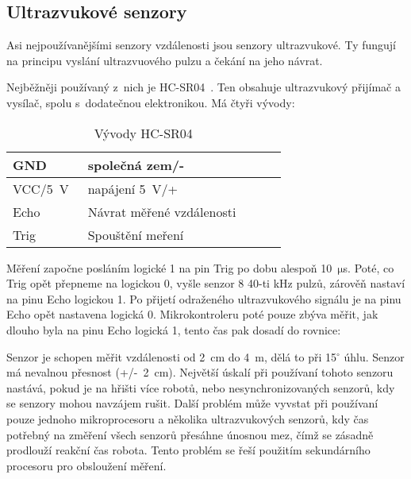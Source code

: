 \subsection{Ultrazvukové senzory}

Asi nejpoužívanějšími senzory vzdálenosti jsou senzory ultrazvukové.
Ty fungují na principu vyslání ultrazvuového pulzu a čekání na jeho návrat.

Nejběžněji používaný z~nich je HC-SR04~\cite{hc-sr04}. 
Ten obsahuje ultrazvukový přijímač a vysílač, spolu s~dodatečnou elektronikou.
Má čtyři vývody: 
\begin{table}[h]
	
	\centering
	\begin{tabular}{|l|l|l|l|l|} \hline
		GND & společná zem/-   \\ \hline
		VCC/5~V~& napájení 5~V/+  \\ \hline
		Echo & Návrat měřené vzdálenosti   \\ \hline
		Trig & Spouštění meření \\ \hline
    \end{tabular}
    \caption{Vývody HC-SR04}
\end{table}

Měření započne posláním logické 1 na pin Trig po dobu alespoň 10~$\mathrm{\mu}$s.
Poté, co Trig opět přepneme na logickou 0, vyšle senzor 8 40-ti kHz pulzů, zárověň nastaví na pinu Echo logickou 1.
Po přijetí odraženého ultrazvukového signálu je na pinu Echo opět nastavena logická 0.
Mikrokontroleru poté pouze zbýva měřit, jak dlouho byla na pinu Echo logická 1, tento čas pak dosadí do rovnice:
    
    
Senzor je schopen měřit vzdálenosti od 2~cm do 4~m, dělá to při 15$^{\circ}$ úhlu.
Senzor má nevalnou přesnost (+/-~2~cm).
Největší úskalí při používaní tohoto senzoru nastává, pokud je na hřišti více robotů, nebo nesynchronizovaných senzorů, kdy se senzory mohou navzájem rušit.
Další problém může vyvstat při používaní pouze jednoho mikroprocesoru a několika ultrazvukových senzorů, kdy čas potřebný na změření všech senzorů přesáhne únosnou mez, čímž se zásadně prodlouží reakční čas robota.
Tento problém se řeší použitím sekundárního procesoru pro obsloužení měření.


